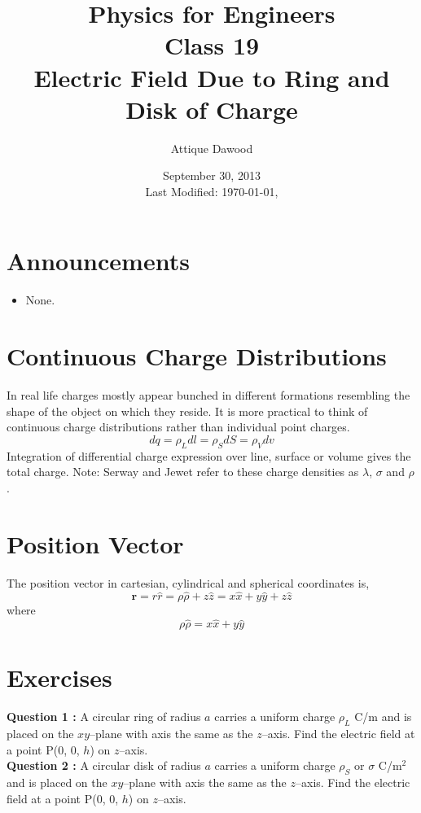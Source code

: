\documentclass[12pt,a4paper]{article}
\title{\vspace{-3cm}Physics for Engineers\\Class 19\\Electric Field Due to Ring and Disk of Charge}
\author{Attique Dawood}
\date{September 30, 2013\\[0.2cm] Last Modified: \today, \currenttime}
\begin{document}
\maketitle
\section{Announcements}
\begin{itemize}
\item None.
\end{itemize}
\section{Continuous Charge Distributions}
In real life charges mostly appear bunched in different formations resembling the shape of the object on which they reside. It is more practical to think of continuous charge distributions rather than individual point charges.
\begin{equation}
dq=\rho_Ldl=\rho_SdS=\rho_Vdv
\end{equation}
Integration of differential charge expression over line, surface or volume gives the total charge.
Note: Serway and Jewet \cite{Serway} refer to these charge densities as $\lambda$, $\sigma$ and $\rho$.
\section{Position Vector}
The position vector in cartesian, cylindrical and spherical coordinates is,
\begin{equation}
\textbf{r}=r\hat r=\rho\hat{\rho}+z\hat z=x\hat x+y\hat y+z\hat z
\end{equation}
where
\begin{equation}
\rho\hat{\rho}=x\hat x+y\hat y
\end{equation}
\section{Exercises}
\noindent\textbf{Question 1 \cite[Example 4.4, page 117]{Sadiku}\cite[Example 23.8, page 721]{Serway}:} A circular ring of radius $a$ carries a uniform charge $\rho_L$ C/m and is placed on the $xy$--plane with axis the same as the $z$--axis. Find the electric field at a point P(0, 0, $h$) on $z$--axis.\\[0.2cm]
\noindent\textbf{Question 2 \cite[Practice Exercise 4.4, page 119]{Sadiku}\cite[Example 23.9, page 722]{Serway}:} A circular disk of radius $a$ carries a uniform charge $\rho_S$ or $\sigma$ C/m$^2$ and is placed on the $xy$--plane with axis the same as the $z$--axis. Find the electric field at a point P(0, 0, $h$) on $z$--axis.


\end{document}
